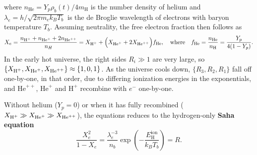 \documentclass[10pt,a4paper]{article}
\begin{document}
where $n_\text{He} = Y_p \rho_b(t) / 4 m_\text{H}$ is the number density of helium and $\lambda_e = h / \sqrt{2 \pi m_e k_B T_b}$ is the de Broglie wavelength of electrons with baryon temperature $T_b$.
Assuming neutrality, the free electron fraction then follows as
\begin{equation}
    X_e = \frac{n_{\text{H}^+} + n_{\text{He}^+} + 2 n_{\text{He}^{++}}}{n_H} = X_{\text{H}^+} +  \Big( X_{\text{He}^+} + 2 X_{\text{He}^{++}} \Big) f_\text{He}, \quad \text{where} \quad f_\text{He} = \frac{n_\text{He}}{n_\text{H}} = \frac{Y_p}{4(1-Y_p)}.
\label{eq_Saha_H_He_Xe}
\end{equation}
In the early hot universe, the right sides $R_i \gg 1$ are very large, so $\{X_{\text{H}^+},X_{\text{He}^+},X_{\text{He}^{++}}\} \approx \{1,0,1\}$.
As the universe cools down, $\{R_3, R_2, R_1\}$ fall off one-by-one, in that order, due to differing ionization energies in the exponentials,
and $\text{He}^{++}$, $\text{He}^+$ and $\text{H}^+$ recombine with $e^-$ one-by-one.

Without helium ($Y_p=0$) or when it has fully recombined ($X_{\text{H}^+} \gg X_{\text{He}^+} \gg X_{\text{He}^{++}}$),
the equations reduces to the hydrogen-only \textbf{Saha equation}
\begin{equation}
	\frac{X_e^2}{1-X_e} = \frac{\lambda_e^{-3}}{n_b} \exp \left( -\frac{E^\text{ion}_\text{H}}{k_B T_b} \right) = R.
\label{eq_saha_H}
\end{equation}
\end{document}
